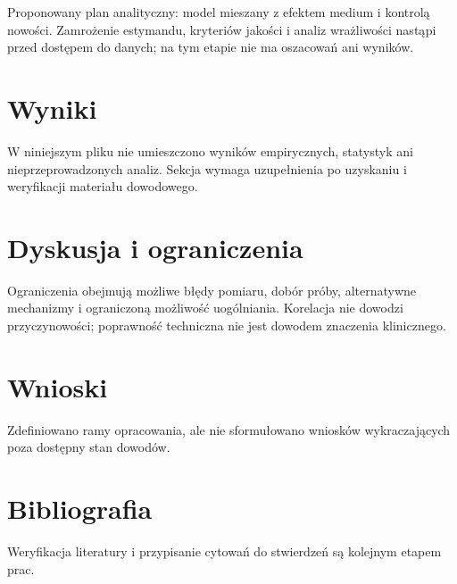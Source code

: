 \documentclass[11pt,a4paper]{article}
\begin{document}
Proponowany plan analityczny: model mieszany z efektem medium i kontrolą nowości. Zamrożenie estymandu, kryteriów jakości i analiz wrażliwości nastąpi przed dostępem do danych; na tym etapie nie ma oszacowań ani wyników.

\section{Wyniki}

W niniejszym pliku nie umieszczono wyników empirycznych, statystyk ani nieprzeprowadzonych analiz. Sekcja wymaga uzupełnienia po uzyskaniu i weryfikacji materiału dowodowego.

\section{Dyskusja i ograniczenia}

Ograniczenia obejmują możliwe błędy pomiaru, dobór próby, alternatywne mechanizmy i ograniczoną możliwość uogólniania. Korelacja nie dowodzi przyczynowości; poprawność techniczna nie jest dowodem znaczenia klinicznego.

\section{Wnioski}

Zdefiniowano ramy opracowania, ale nie sformułowano wniosków wykraczających poza dostępny stan dowodów.

\section*{Bibliografia}

Weryfikacja literatury i przypisanie cytowań do stwierdzeń są kolejnym etapem prac.
\end{document}
